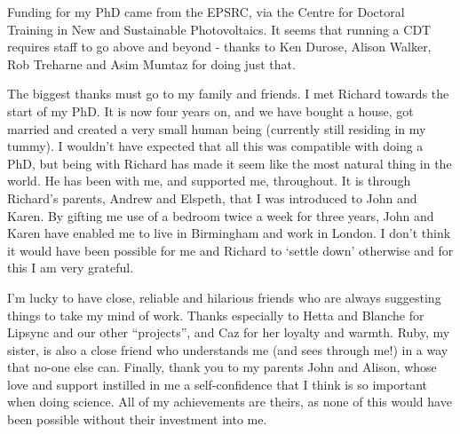 Funding for my PhD came from the EPSRC, via the Centre for Doctoral Training in New and Sustainable Photovoltaics. It seems that running a CDT requires staff to go above and beyond - thanks to Ken Durose, Alison Walker, Rob Treharne and Asim Mumtaz for doing just that.

The biggest thanks must go to my family and friends. I met Richard towards the start of my PhD. It is now four years on, and we have bought a house, got married and created a very small human being (currently still residing in my tummy). I wouldn't have expected that all this was compatible with doing a PhD, but being with Richard has made it seem like the most natural thing in the world. He has been with me, and supported me, throughout. It is through Richard's parents, Andrew and Elspeth, that I was introduced to John and Karen. By gifting me use of a bedroom twice a week for three years, John and Karen have enabled me to live in Birmingham and work in London. I don't think it would have been possible for me and Richard to `settle down' otherwise and for this I am very grateful.

I'm lucky to have close, reliable and hilarious friends who are always suggesting things to take my mind of work. Thanks especially to Hetta and Blanche for Lipsync and our other ``projects'', and Caz for her loyalty and warmth. Ruby, my sister, is also a close friend who understands me (and sees through me!) in a way that no-one else can. Finally, thank you to my parents John and Alison, whose love and support instilled in me a self-confidence that I think is so important when doing science. All of my achievements are theirs, as none of this would have been possible without their investment into me.